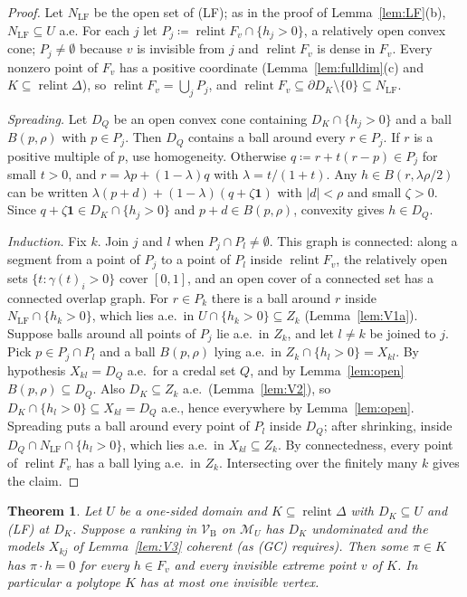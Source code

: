 \documentclass[11pt]{article}
\newcommand{\one}{\mathbf{1}}
\newcommand{\M}{\mathcal{M}}
\newcommand{\VBB}{\mathcal{V}_{\mathrm B}}
\DeclareMathOperator{\relint}{relint}
\theoremstyle{plain}
\newtheorem{theorem}{Theorem}[section]
\theoremstyle{definition}
\theoremstyle{remark}
\begin{document}
\begin{proof}
Let $N_{\mathrm{LF}}$ be the open set of (LF); as in the proof of Lemma~\ref{lem:LF}(b),
$N_{\mathrm{LF}}\subseteq U$ a.e. For each $j$ let $P_j\coloneqq\relint F_v\cap
\{h_j>0\}$, a relatively open convex cone; $P_j\neq\emptyset$ because $v$ is invisible from
$j$ and $\relint F_v$ is dense in $F_v$. Every nonzero point of $F_v$ has a positive
coordinate (Lemma~\ref{lem:fulldim}(c) and $K\subseteq\relint\Delta$), so $\relint
F_v=\bigcup_jP_j$, and $\relint F_v\subseteq\partial D_K\setminus\{0\}\subseteq
N_{\mathrm{LF}}$.

\emph{Spreading.} Let $D_Q$ be an open convex cone containing $D_K\cap\{h_j>0\}$ and a
ball $B(p,\rho)$ with $p\in P_j$. Then $D_Q$ contains a ball around every $r\in P_j$. If
$r$ is a positive multiple of $p$, use homogeneity. Otherwise $q\coloneqq r+t(r-p)\in P_j$
for small $t>0$, and $r=\lambda p+(1-\lambda)q$ with $\lambda=t/(1+t)$. Any $h\in
B(r,\lambda\rho/2)$ can be written $\lambda(p+d)+(1-\lambda)(q+\zeta\one)$ with
$|d|<\rho$ and small $\zeta>0$. Since $q+\zeta\one\in D_K\cap\{h_j>0\}$ and $p+d\in
B(p,\rho)$, convexity gives $h\in D_Q$.

\emph{Induction.} Fix $k$. Join $j$ and $l$ when $P_j\cap P_l\ne\emptyset$. This graph is
connected: along a segment from a point of $P_j$ to a point of $P_l$ inside $\relint F_v$,
the relatively open sets $\{t:\gamma(t)_i>0\}$ cover $[0,1]$, and an open cover of a
connected set has a connected overlap graph. For $r\in P_k$ there is a ball around $r$
inside $N_{\mathrm{LF}}\cap\{h_k>0\}$, which lies a.e.\ in $U\cap\{h_k>0\}\subseteq Z_k$
(Lemma~\ref{lem:V1a}). Suppose balls around all points of $P_j$ lie a.e.\ in $Z_k$, and
let $l\ne k$ be joined to $j$. Pick $p\in P_j\cap P_l$ and a ball $B(p,\rho)$ lying a.e.\ in
$Z_k\cap\{h_l>0\}=X_{kl}$. By hypothesis $X_{kl}=D_Q$ a.e.\ for a credal set $Q$, and by
Lemma~\ref{lem:open} $B(p,\rho)\subseteq D_Q$. Also $D_K\subseteq Z_k$ a.e.\
(Lemma~\ref{lem:V2}), so $D_K\cap\{h_l>0\}\subseteq X_{kl}=D_Q$ a.e., hence everywhere by
Lemma~\ref{lem:open}. Spreading puts a ball around every point of $P_l$ inside $D_Q$; after
shrinking, inside $D_Q\cap N_{\mathrm{LF}}\cap\{h_l>0\}$, which lies a.e.\ in $X_{kl}
\subseteq Z_k$. By connectedness, every point of $\relint F_v$ has a ball lying a.e.\ in
$Z_k$. Intersecting over the finitely many $k$ gives the claim.
\end{proof}

\begin{theorem}\label{thm:A}
Let $U$ be a one-sided domain and $K\subseteq\relint\Delta$ with $D_K\subseteq U$ and (LF)
at $D_K$. Suppose a ranking in $\VBB$ on $\M_U$ has $D_K$ undominated and the models
$X_{kj}$ of Lemma~\ref{lem:V3} coherent (as (GC) requires). Then some $\pi\in K$ has
$\pi\cdot h=0$ for every $h\in F_v$ and every invisible extreme point $v$ of $K$. In
particular a polytope $K$ has at most one invisible vertex.
\end{theorem}
\end{document}
